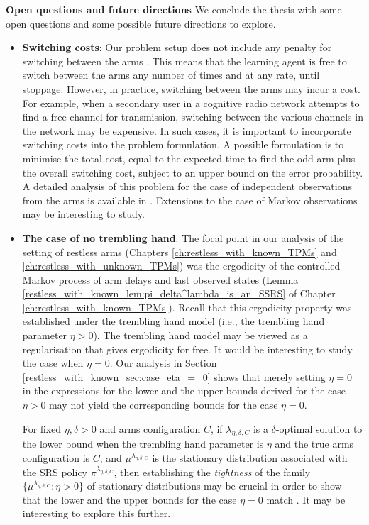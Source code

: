 \noindent \textbf{Open questions and future directions} \hspace{0.1cm} We conclude the thesis with some open questions and some possible future directions to explore. 
\begin{itemize}
\item \textbf{Switching costs}: 
Our problem setup does not include any penalty for switching between the arms \cite{krishnasamy2018augmenting, vaidhiyan2015active}. This means that the learning agent is free to switch between the arms any number of times and at any rate, until stoppage. However, in practice, switching between the arms may incur a cost. For example, when a secondary user in a cognitive radio network attempts to find a free channel for transmission, switching between the various channels in the network may be expensive. In such cases, it is important to incorporate switching costs into the problem formulation. A possible formulation is to minimise the total cost, equal to the expected time to find the odd arm plus the overall switching cost, subject to an upper bound on the error probability. A detailed analysis of this problem for the case of independent observations from the arms is available in \cite{prabhu2017learning}. Extensions to the case of Markov observations may be interesting to study.
\item \textbf{The case of no trembling hand}: The focal point in our analysis of the setting of restless arms (Chapters \ref{ch:restless_with_known_TPMs} and \ref{ch:restless_with_unknown_TPMs}) was the ergodicity of the controlled Markov process of arm delays and last observed states  (Lemma \ref{restless_with_known_lem:pi_delta^lambda_is_an_SSRS} of Chapter \ref{ch:restless_with_known_TPMs}). Recall that this ergodicity property was established under the trembling hand model (i.e., the trembling hand parameter $\eta>0$). The trembling hand model may be viewed as a regularisation that gives ergodicity for free. It would be interesting to study the case when $\eta=0$. Our analysis in Section \ref{restless_with_known_sec:case_eta_=_0} shows that merely setting $\eta=0$ in the expressions for the lower and the upper bounds derived for the case $\eta>0$ may not yield the corresponding bounds for the case $\eta=0$. 

For fixed $\eta, \delta>0$ and arms configuration $C$, if $\lambda_{\eta, \delta,C}$ is a $\delta$-optimal solution to the lower bound when the trembling hand parameter is $\eta$ and the true arms configuration is $C$, and $\mu^{\lambda_{\eta, \delta, C}}$ is the stationary distribution associated with the SRS policy $\pi^{\lambda_{\eta, \delta,C}}$, then establishing the {\em tightness} of the family $\{\mu^{\lambda_{\eta, \delta,C}}:\eta>0\}$ of stationary distributions may be crucial in order to show that the lower and the upper bounds for the case $\eta=0$ match \cite[Theorem 3.1, pp. 61]{fleming2012stochastic}. It may be interesting to explore this further.


\end{itemize}

